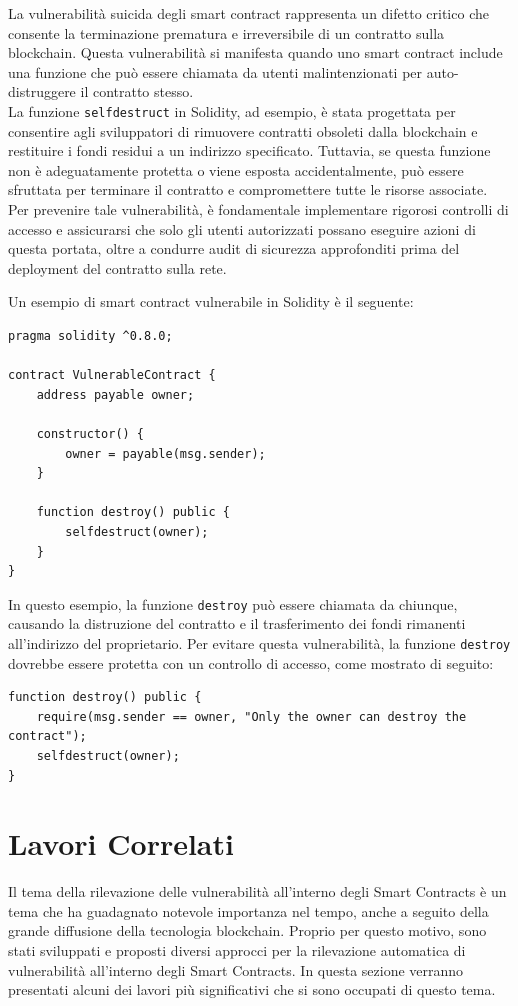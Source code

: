 \documentclass[../../Thesis.tex]{subfiles}
\begin{document}
La vulnerabilit\`a suicida degli smart contract rappresenta un difetto critico che consente la terminazione prematura e irreversibile di un contratto sulla blockchain. Questa vulnerabilit\`a si manifesta quando uno smart contract include una funzione che pu\`o essere chiamata da utenti malintenzionati per auto-distruggere il contratto stesso.\\
La funzione \texttt{selfdestruct} in Solidity, ad esempio, \`e stata progettata per consentire agli sviluppatori di rimuovere contratti obsoleti dalla blockchain e restituire i fondi residui a un indirizzo specificato. Tuttavia, se questa funzione non \`e adeguatamente protetta o viene esposta accidentalmente, pu\`o essere sfruttata per terminare il contratto e compromettere tutte le risorse associate. Per prevenire tale vulnerabilit\`a, \`e fondamentale implementare rigorosi controlli di accesso e assicurarsi che solo gli utenti autorizzati possano eseguire azioni di questa portata, oltre a condurre audit di sicurezza approfonditi prima del deployment del contratto sulla rete.

Un esempio di smart contract vulnerabile in Solidity \`e il seguente:

\begin{lstlisting}[language=Solidity]
pragma solidity ^0.8.0;

contract VulnerableContract {
    address payable owner;

    constructor() {
        owner = payable(msg.sender);
    }

    function destroy() public {
        selfdestruct(owner);
    }
}
\end{lstlisting}

In questo esempio, la funzione \texttt{destroy} pu\`o essere chiamata da chiunque, causando la distruzione del contratto e il trasferimento dei fondi rimanenti all'indirizzo del proprietario. Per evitare questa vulnerabilit\`a, la funzione \texttt{destroy} dovrebbe essere protetta con un controllo di accesso, come mostrato di seguito:

\begin{lstlisting}[language=Solidity]
function destroy() public {
    require(msg.sender == owner, "Only the owner can destroy the contract");
    selfdestruct(owner);
}
\end{lstlisting}



\section{Lavori Correlati}
\label{ch:relatedwork}
Il tema della rilevazione delle vulnerabilit\`a all'interno degli Smart Contracts \`e un tema che ha guadagnato notevole importanza nel tempo, anche a seguito della grande diffusione della tecnologia blockchain. Proprio per questo motivo, sono stati sviluppati e proposti diversi approcci per la rilevazione automatica di vulnerabilit\`a all'interno degli Smart Contracts. In questa sezione verranno presentati alcuni dei lavori pi\`u significativi che si sono occupati di questo tema.
\end{document}
